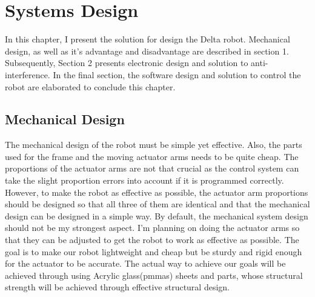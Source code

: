 \chapter{Systems Design}

In this chapter, I present the solution for design the Delta robot. 
Mechanical design, as well as it's advantage and disadvantage are described in section 1. Subsequently, Section 2 presents electronic design and solution to anti-interference. In the final section, the software design and solution to control the robot are elaborated to conclude this chapter.

\section{Mechanical Design}

The mechanical design of the robot must be simple yet effective. Also, the parts used for the frame and the moving actuator arms needs to be quite cheap. The proportions of the actuator arms are not that crucial as the control system can take the slight proportion errors into account if it is programmed correctly. However, to make the robot as effective as possible, the actuator arm proportions should be designed so that all three of them are identical and that the mechanical design can be designed in a simple way. By default, the mechanical system design should not be my strongest aspect. I'm planning on doing the actuator arms so that they can be adjusted to get the robot to work as effective as possible. The goal is to make our robot lightweight and cheap but be sturdy and rigid enough for the actuator to be  accurate. The actual way to achieve our goals will be achieved through using Acrylic glass(\glspl{pmma}) sheets and parts, whose structural strength will be achieved through effective structural design.

